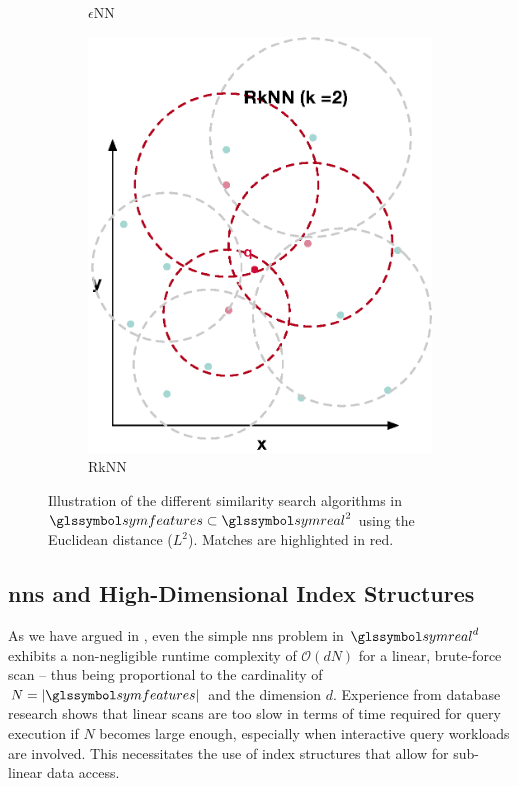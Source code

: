 \begin{figure}
\begin{subfigure}[b]{0.25\textwidth}
        \caption{$\epsilon$NN}
        \label{fig:enn}
    \end{subfigure}
    \hfill
    \begin{subfigure}[b]{0.25\textwidth}
        \centering
        \includegraphics[width=\textwidth]{figures/rknn}
        \caption{RkNN}
        \label{fig:rknn}
    \end{subfigure}
    \caption{Illustration of the different similarity search algorithms in $\symfeatures \subset \symreal^2$ using the Euclidean distance ($L^2$). Matches are highlighted in red.}
    \label{fig:sim_search_algorithm}
\end{figure}

\subsection{\acrshort{nns} and High-Dimensional Index Structures}

As we have argued in , even the simple \acrshort{nns} problem in $\symreal^d$ exhibits a non-negligible runtime complexity of $\mathcal{O}(dN)$ for a linear, brute-force scan -- thus being proportional to the cardinality of $N = |\symfeatures|$ and the dimension $d$. Experience from database research shows that linear scans are too slow in terms of time required for query execution if $N$ becomes large enough, especially when interactive query workloads are involved. This necessitates the use of index structures that allow for sub-linear data access.

